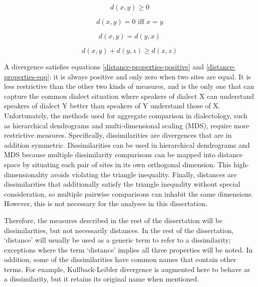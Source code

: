 \begin{equation}
  d(x,y) \ge 0
  \label{distance-properties-positive}
\end{equation}

\begin{equation}
 d(x,y) = 0 \textrm{ iff } x=y
 \label{distance-properties-eqq}
\end{equation}

\begin{equation}
  d(x,y) = d(y,x)
\end{equation}

\begin{equation}
  d(x,y) + d(y,z) \ge d(x,z)
\label{distance-properties-triangle}
\end{equation}

A divergence satisfies equations \ref{distance-properties-positive}
and \ref{distance-properties-eqq}: it is always positive and only zero
when two sites are equal. It is less restrictive than the other two
kinds of measures, and is the only one that can capture the common
dialect situation where speakers of dialect X can understand speakers
of dialect Y better than speakers of Y understand those of
X. Unfortunately, the methods used for aggregate comparison in
dialectology, such as hierarchical dendrograms and multi-dimensional
scaling (MDS), require more restrictive measures. Specifically,
dissimilarities are divergences that are in addition
symmetric. Dissimilarities can be used in hierarchical dendrograms and
MDS because multiple dissimilarity comparisons can be mapped into
distance space by situating each pair of sites in its own orthogonal
dimension. This high-dimensionality avoids violating the triangle
inequality. Finally, distances are dissimilarities that additionally
satisfy the triangle inequality without special consideration, so
multiple pairwise comparisons can inhabit the same
dimensions. However, this is not necessary for the analyses in this
dissertation.

Therefore, the measures described in the rest of the dissertation will
be dissimilarities, but not necessarily distances. In the rest of the
dissertation, `distance' will usually be used as a generic term to
refer to a dissimilarity; exceptions where the term `distance' implies
all three properties will be noted. In addition, some of the
dissimilarities have common names that contain other terms. For
example, Kullback-Leibler divergence is augmented here to behave as a
dissimilarity, but it retains its original name when mentioned.


